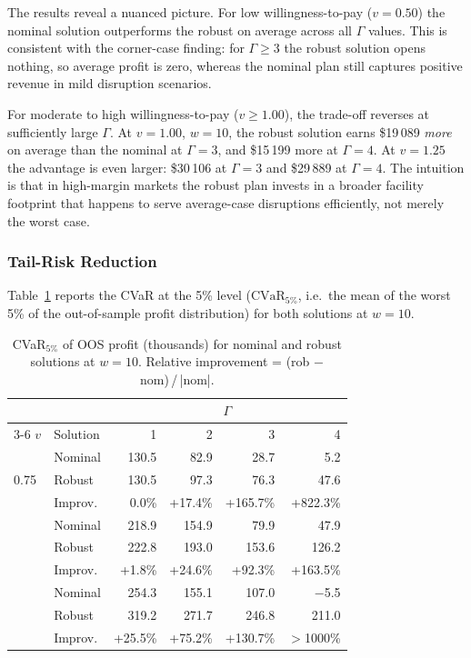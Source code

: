 The results reveal a nuanced picture.  For low willingness-to-pay
($v = 0.50$) the nominal solution outperforms the robust on average
across all $\Gamma$ values.  This is consistent with the corner-case
finding: for $\Gamma \geq 3$ the robust solution opens nothing, so
average profit is zero, whereas the nominal plan still captures
positive revenue in mild disruption scenarios.

For moderate to high willingness-to-pay ($v \geq 1.00$), the
trade-off reverses at sufficiently large $\Gamma$.  At $v = 1.00$,
$w = 10$, the robust solution earns \$19\,089 \emph{more} on average
than the nominal at $\Gamma = 3$, and \$15\,199 more at $\Gamma = 4$.
At $v = 1.25$ the advantage is even larger: \$30\,106 at $\Gamma = 3$
and \$29\,889 at $\Gamma = 4$.
The intuition is that in high-margin markets the robust plan invests in
a broader facility footprint that happens to serve average-case
disruptions efficiently, not merely the worst case.

\subsubsection*{Tail-Risk Reduction}

Table~\ref{tab:cvar_rob} reports the CVaR at the 5\% level
($\text{CVaR}_{5\%}$, i.e.\ the mean of the worst 5\% of the
out-of-sample profit distribution) for both solutions at $w = 10$.

\begin{table}[htbp]
\centering
\caption{CVaR$_{5\%}$ of OOS profit (thousands) for nominal and
         robust solutions at $w = 10$.
         Relative improvement = (rob $-$ nom)\,/\,|nom|.}
\label{tab:cvar_rob}
\setlength{\tabcolsep}{5pt}
\begin{tabular}{llrrrr}
\toprule
& & \multicolumn{4}{c}{$\Gamma$} \\
\cmidrule(lr){3-6}
$v$ & Solution & 1 & 2 & 3 & 4 \\
\midrule
\multirow{3}{*}{0.75}
  & Nominal & 130.5 &  82.9 &  28.7 &   5.2 \\
  & Robust  & 130.5 &  97.3 &  76.3 &  47.6 \\
  & Improv. &  0.0\% & +17.4\% & +165.7\% & +822.3\% \\
\addlinespace
\multirow{3}{*}{1.00}
  & Nominal & 218.9 & 154.9 &  79.9 &  47.9 \\
  & Robust  & 222.8 & 193.0 & 153.6 & 126.2 \\
  & Improv. & +1.8\% & +24.6\% &  +92.3\% & +163.5\% \\
\addlinespace
\multirow{3}{*}{1.25}
  & Nominal & 254.3 & 155.1 & 107.0 &  $-$5.5 \\
  & Robust  & 319.2 & 271.7 & 246.8 & 211.0 \\
  & Improv. & +25.5\% & +75.2\% & +130.7\% & $>$1000\% \\
\bottomrule
\end{tabular}
\end{table}

